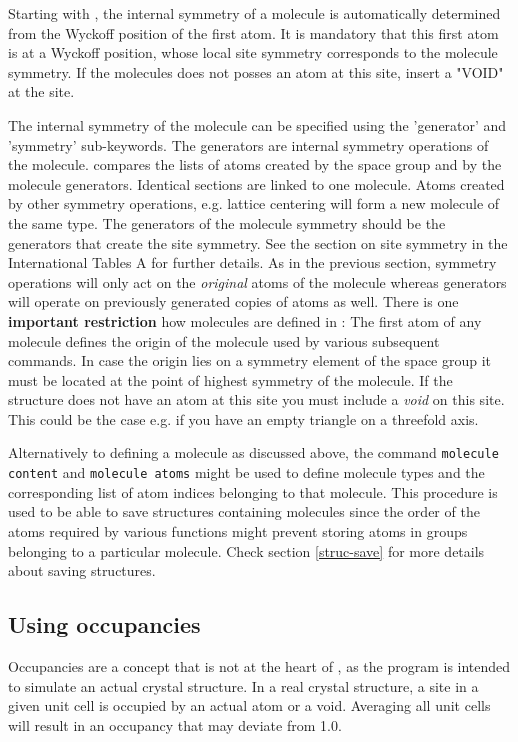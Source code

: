 Starting with , the internal symmetry of a molecule
is automatically determined from the Wyckoff position of the first
atom. It is mandatory that this first atom is at a Wyckoff position,
whose local site symmetry corresponds to the molecule symmetry. If 
the molecules does not posses an atom at this site, insert a 
"VOID" at the site.

The internal symmetry of the molecule can be specified using the
'generator' and 'symmetry' sub-keywords.  The generators are
internal symmetry operations of the molecule.  \Discus compares
the lists of atoms created by the space group and by the molecule
generators.  Identical sections are linked to one molecule.  Atoms
created by other symmetry operations, e.g.  lattice centering will
form a new molecule of the same type.  The generators of the
molecule symmetry should be the generators that create the site
symmetry.  See the section on site symmetry in the International
Tables A \cite{tables} for further details.  As in the previous
section, symmetry operations will only act on the {\it original}
atoms of the molecule whereas generators will operate on previously
generated copies of atoms as well. There is one {\bf important
restriction} how molecules are defined in {\discus}: The first
atom of any molecule defines the origin of the molecule used by
various subsequent commands.  In case the origin lies on a symmetry
element of the space group it must be located at the point of
highest symmetry of the molecule.  If the structure does not have an
atom at this site you must include a {\it void} on this site.  This
could be the case e.g.  if you have an empty triangle on a threefold
axis.
\par

Alternatively to defining a molecule as discussed above, the command
{\tt molecule content} and {\tt molecule atoms} might be used to
define molecule types and the corresponding list of atom indices
belonging to that molecule. This procedure is used to be able to
save structures containing molecules since the order of the atoms
required by various \Discus functions might prevent storing
atoms in groups belonging to a particular molecule. Check section
\ref {struc-save} for more details about saving structures.

\subsection{Using occupancies \label{occ}}

Occupancies are a concept that is not at the heart of \discus, as
the program is intended to simulate an actual crystal structure. In
a real crystal structure, a site in a given unit cell is occupied by 
an actual atom or a void. Averaging all unit cells will result in 
an occupancy that may deviate from 1.0. 

